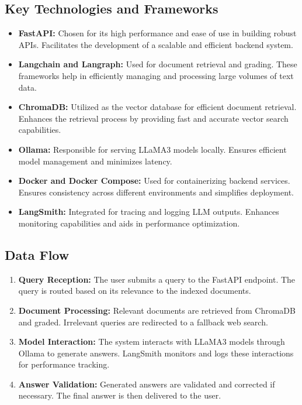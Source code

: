 \subsection{Key Technologies and Frameworks}

\begin{itemize}
    \item \textbf{FastAPI:} Chosen for its high performance and ease of use in building robust APIs. Facilitates the development of a scalable and efficient backend system.

    \item \textbf{Langchain and Langraph:} Used for document retrieval and grading. These frameworks help in efficiently managing and processing large volumes of text data.

    \item \textbf{ChromaDB:} Utilized as the vector database for efficient document retrieval. Enhances the retrieval process by providing fast and accurate vector search capabilities.

    \item \textbf{Ollama:} Responsible for serving LLaMA3 models locally. Ensures efficient model management and minimizes latency.

    \item \textbf{Docker and Docker Compose:} Used for containerizing backend services. Ensures consistency across different environments and simplifies deployment.

    \item \textbf{LangSmith:} Integrated for tracing and logging LLM outputs. Enhances monitoring capabilities and aids in performance optimization.
\end{itemize}

\subsection{Data Flow}

\begin{enumerate}
    \item \textbf{Query Reception:} The user submits a query to the FastAPI endpoint. The query is routed based on its relevance to the indexed documents.

    \item \textbf{Document Processing:} Relevant documents are retrieved from ChromaDB and graded. Irrelevant queries are redirected to a fallback web search.

    \item \textbf{Model Interaction:} The system interacts with LLaMA3 models through Ollama to generate answers. LangSmith monitors and logs these interactions for performance tracking.

    \item \textbf{Answer Validation:} Generated answers are validated and corrected if necessary. The final answer is then delivered to the user.
\end{enumerate}

